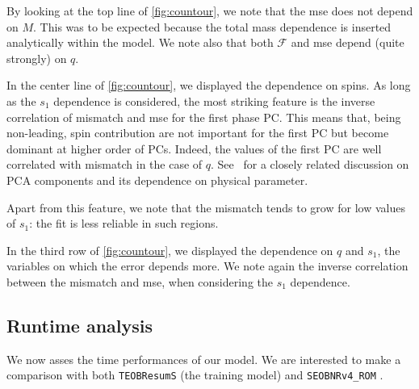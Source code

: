 \par
By looking at the top line of \ref{fig:countour}, we note that the mse does not depend on $M$. This was to be expected because the total mass dependence is inserted analytically within the model.
We note also that both $\mathcal{F}$ and mse depend (quite strongly) on $q$.
\par
In the center line of \ref{fig:countour}, we displayed the dependence on spins.
As long as the $s_1$ dependence is considered, the most striking feature is the inverse correlation of mismatch and mse for the first phase PC.
This means that, being non-leading, spin contribution are not important for the first PC but become dominant at higher order of PCs.
Indeed, the values of the first PC are well correlated with mismatch in the case of $q$. See~\cite{Ohme2013PCA_GW} for a closely related discussion on PCA components and its dependence on physical parameter.
\par
Apart from this feature, we note that the mismatch tends to grow for low values of $s_1$: the fit is less reliable in such regions.
\par
In the third row of \ref{fig:countour}, we displayed the dependence on $q$ and $s_1$, the variables on which the error depends more.
We note again the inverse correlation between the mismatch and mse, when considering the $s_1$ dependence.
\subsection{Runtime analysis} \label{sec:runtime}
We now asses the time performances of our model.
We are interested to make a comparison with both \texttt{TEOBResumS}
(the training model) and \texttt{SEOBNRv4\_ROM} \cite{Boh__2017__SEOBNRv4}.
%
